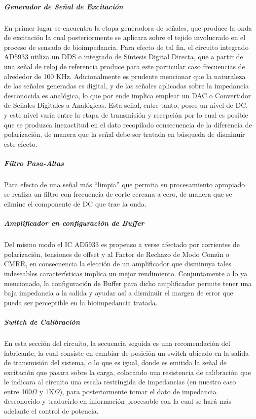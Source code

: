 \documentclass[12pt,letterpaper,spanish]{article}
\begin{document}
					\subparagraph{Generador de Señal de Excitación}
					\hfill\break
En primer lugar se encuentra la etapa generadora de señales, que produce la onda de excitación la cual posteriormente se aplicara sobre el tejido involucrado en el proceso de sensado de bioimpedancia. Para efecto de tal fin, el circuito integrado AD5933 utiliza un DDS o integrado de Síntesis Digital Directa, que a partir de una señal de reloj de referencia produce para este particular caso frecuencias de alrededor de 100 KHz. Adicionalmente es prudente mencionar que la naturaleza de las señales generadas es digital, y de las señales aplicadas sobre la impedancia desconocida es analógica, lo que por ende  implica emplear un DAC o Convertidor de Señales Digitales a Analógicas.
Esta señal, entre tanto, posee un nivel de DC, y este nivel varía entre la etapa de transmisión y recepción   por lo cual es posible que se produzca inexactitud en el dato recopilado consecuencia de la diferencia de polarización, de manera que la señal debe ser tratada en búsqueda de disminuir este efecto. 

					\subparagraph{Filtro Pasa-Altas}
					\hfill\break
Para efecto de una señal más “limpia” que permita su procesamiento apropiado se  realiza un filtro con frecuencia de corte cercana a cero, de manera que se elimine el componente de DC que trae la onda.											

					\subparagraph{Amplificador en configuración de Buffer}
					\hfill\break
Del mismo modo el IC AD5933 es propenso a verse afectado por corrientes de polarización, tensiones de offset y al Factor de Rechazo de Modo Común o CMRR, en consecuencia  la elección de un amplificador que disminuya tales indeseables características implica un mejor rendimiento. Conjuntamente a lo ya mencionado, la configuración de Buffer para dicho amplificador permite tener una baja impedancia a la salida y ayudar así a disminuir el margen de error que pueda ser perceptible en la bioimpedancia tratada.				

					\subparagraph{Switch de Calibración}
					\hfill\break
En esta sección del circuito, la secuencia seguida es una recomendación del fabricante, la cual consiste en cambiar de posición un switch ubicado en la salida de transmisión del sistema, o lo que es igual, donde es emitida la señal de excitación que pasara sobre la carga, colocando una resistencia de calibración que le indicara al circuito una escala restringida de impedancias (en nuestro caso entre 100$\Omega $ y 1K$\Omega $), para posteriormente tomar el dato de impedancia desconocido y traducirlo en información procesable con la cual se hará más adelante el control de potencia.				
				
\end{document}
